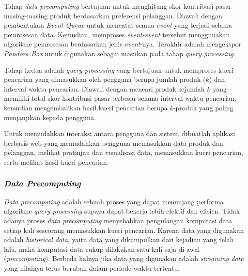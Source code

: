Tahap \textit{data precomputing} bertujuan untuk menghitung skor kontribusi pasar masing-masing produk berdasarkan preferensi pelanggan. Diawali dengan pembentukan \textit{Event Queue} untuk mencatat semua \textit{event} yang terjadi selama pemrosesan data. Kemudian, memproses \textit{event-event} tersebut menggunakan algoritme pemrosesan berdasarkan jenis \textit{event}-nya. Terakhir adalah mengekspor \textit{Pandora Box} untuk digunakan sebagai masukan pada tahap \textit{query processing}.

Tahap kedua adalah \textit{query processing} yang bertujuan untuk memproses kueri pencarian yang dimasukkan oleh pengguna berupa jumlah produk ($k$) dan interval waktu pencarian. Diawali dengan mencari produk sejumlah $k$ yang memiliki total skor kontribusi pasar terbesar selama interval waktu pencarian, kemudian mengembalikan hasil kueri pencarian berupa $k$-produk yang paling menjanjikan kepada pengguna.

Untuk memudahkan interaksi antara pengguna dan sistem, dibuatlah aplikasi berbasis web yang memudahkan pengguna memasukkan data produk dan pelanggan, melihat pratinjau dan visualisasi data, memasukkan kueri pencarian, serta melihat hasil kueri pencarian.   

\subsubsection{\textit{Data Precomputing}}
\tab \textit{Data precomputing} adalah sebuah proses yang dapat menunjang performa algoritme \textit{query processing} supaya dapat bekerja lebih efektif dan efisien. Tidak adanya proses \textit{data precomputing} menyebabkan pengulangan komputasi data setiap kali seseorang memasukkan kueri pencarian. Karena data yang digunakan adalah \textit{historical data}, yaitu data yang dikumpulkan dari kejadian yang telah lalu, maka komputasi data cukup dilakukan satu kali saja di awal (\textit{precomputing}). Berbeda halnya jika data yang digunakan adalah \textit{streaming data} yang nilainya terus berubah dalam periode waktu tertentu.
	
